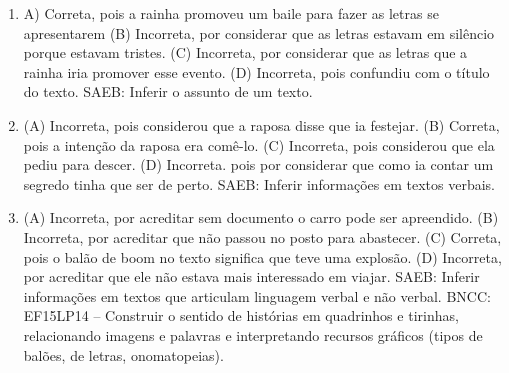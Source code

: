 \begin{enumerate}
\item
A) Correta, pois a rainha promoveu um baile para fazer as letras se
apresentarem
(B) Incorreta, por considerar que as letras estavam em silêncio porque
estavam tristes.
(C) Incorreta, por considerar que as letras que a rainha iria promover
esse evento.
(D) Incorreta, pois confundiu com o título do texto.
SAEB: Inferir o assunto de um texto.

\item
(A) Incorreta, pois considerou que a raposa disse que ia festejar.
(B) Correta, pois a intenção da raposa era comê-lo.
(C) Incorreta, pois considerou que ela pediu para descer.
(D) Incorreta. pois por considerar que como ia contar um segredo tinha
que ser de perto.
SAEB: Inferir informações em textos verbais.

\item
(A) Incorreta, por acreditar sem documento o carro pode ser apreendido.
(B) Incorreta, por acreditar que não passou no posto para abastecer.
(C) Correta, pois o balão de boom no texto significa que teve uma explosão.
(D) Incorreta, por acreditar que ele não estava mais interessado em viajar.
SAEB: Inferir informações em textos que articulam linguagem verbal e não verbal.
BNCC: EF15LP14 -- Construir o sentido de histórias em quadrinhos e tirinhas, relacionando imagens e palavras e interpretando recursos gráficos (tipos de balões, de letras, onomatopeias).
\end{enumerate}

\blankpage